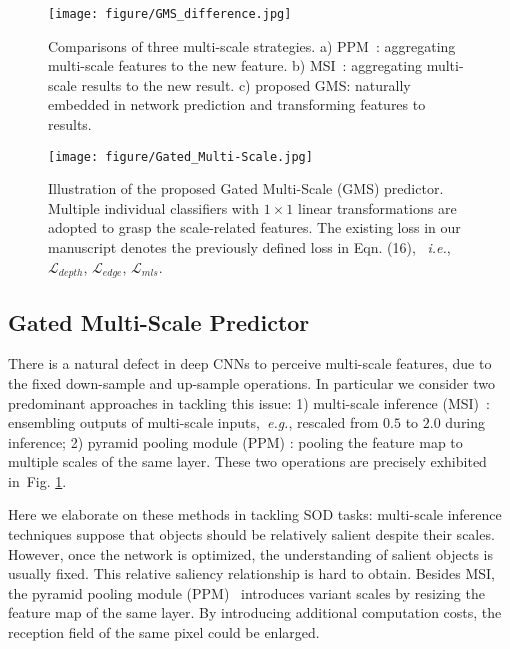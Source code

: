 \documentclass[journal]{IEEEtran}
\def\ie{{\em i.e.}}
\def\eg{{\em e.g.}}
\newcommand{\figref}[1]{Fig. \ref{#1}}
\newcommand{\mc}[1]{\mathcal{#1}}
\begin{document}
\begin{figure}[t]
\begin{center}
\texttt{[image: figure/GMS\_difference.jpg]}
		\caption{Comparisons of three multi-scale strategies. a) PPM~\cite{zhao2017pyramid}: aggregating multi-scale features to the new feature.  b) MSI~\cite{chen2016attention}: aggregating multi-scale results to the new result. c) proposed GMS: naturally embedded in network prediction and transforming features to results.}\label{fig:GMS difference}
	\end{center}
\end{figure}



\begin{figure}[t]
\begin{center}
\texttt{[image: figure/Gated\_Multi-Scale.jpg]}
	\caption{Illustration of the proposed Gated Multi-Scale (GMS) predictor. Multiple individual classifiers with $1\times 1$ linear transformations are adopted to grasp the scale-related features.  The existing loss in our manuscript denotes the previously defined loss in Eqn. (16), ~\ie, $\mc{L}_{depth}$, $\mc{L}_{edge}$, $\mc{L}_{mls}$.}\label{fig:GMS}
	\end{center}
\end{figure}


\subsection{Gated Multi-Scale Predictor}\label{sec:gms}
There is a natural defect in deep CNNs to perceive multi-scale features, due to the fixed down-sample and up-sample operations. In particular we consider two predominant approaches in tackling this issue: 1) multi-scale inference (MSI)~\cite{chen2016attention}: ensembling outputs of multi-scale inputs,~\eg, rescaled from $0.5$ to $2.0$ during inference; 2) pyramid pooling module (PPM) \cite{zhao2017pyramid,zhao2019pyramid}: pooling the feature map to multiple scales of the same layer. These two operations are precisely exhibited in~\figref{fig:GMS difference}.


Here we elaborate on these methods in tackling SOD tasks:
multi-scale inference techniques suppose that objects should be relatively salient despite their scales. However, once the network is optimized, the understanding of salient objects is usually fixed. This relative saliency relationship is hard to obtain. Besides MSI, the pyramid pooling module (PPM)~\cite{zhao2017pyramid} introduces variant scales by resizing the feature map of the same layer. By introducing additional computation costs, the reception field of the same pixel could be enlarged.
\end{document}
